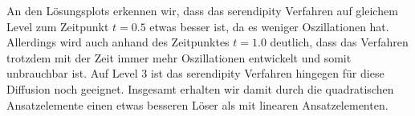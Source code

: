 \begin{figure}[H]
	\centering
\end{figure}

An den Lösungsplots erkennen wir, dass das serendipity Verfahren auf gleichem Level zum Zeitpunkt $t=0.5$ etwas besser ist, da es weniger Oszillationen hat. Allerdings wird auch anhand des Zeitpunktes $t=1.0$ deutlich, dass das Verfahren trotzdem mit der Zeit immer mehr Oszillationen entwickelt und somit unbrauchbar ist.
Auf Level 3 ist das serendipity Verfahren hingegen für diese Diffusion noch geeignet. Insgesamt erhalten wir damit durch die quadratischen Ansatzelemente einen etwas besseren Löser als mit linearen Ansatzelementen.



